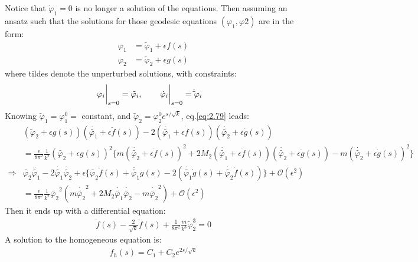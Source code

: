 Notice that $\dot \varphi_{1} = 0$ is no longer a solution of the equations. Then assuming an ansatz such that the solutions for those geodesic equations $(\varphi_{1}, \varphi{2})$ are in the form:
\begin{align}[left=\empheqlbrace]
    \varphi_{1} &= \tilde \varphi_{1} + \epsilon f(s) \\
    \varphi_{2} &= \tilde \varphi_{2} + \epsilon g(s) 
\end{align}
where tildes denote the unperturbed solutions, with constraints:
\begin{align}
    \eval{\varphi_{i} } _{s=0} = \tilde \varphi_{i} ,& \qq{} \eval{\dot \varphi_{i}} _{s=0} = \dot \tilde\varphi_{i} 
\end{align}
Knowing $\tilde \varphi_{1} = \varphi_{1}^{0} =$ constant, and $\tilde \varphi_{2} = \varphi_{2} ^{0} e^{s/\sqrt{k}}$, eq.\ref{eq:2.79} leads:
\begin{align}
    &(\tilde \varphi_{2} + \epsilon g(s))(\ddot {\tilde {\varphi_{1}}} + \epsilon \ddot f(s)) - 2 (\dot {\tilde{\varphi_{1}}} + \epsilon \dot {f}(s))(\dot {\tilde{\varphi_{2}}} +\epsilon \dot{g}(s)) \nonumber \\
    &= \frac{\epsilon}{8\pi^{2}}\frac{1}{k^2} (\tilde{\varphi_{2}} + \epsilon g(s))^{2}\lbrace m(\dot{\tilde{\varphi_{2}}} + \epsilon \dot{f}(s))^{2} +2M_{2} (\dot{\tilde{\varphi_{1}}} + \epsilon \dot{f}(s))(\dot{\tilde{\varphi_{2}}} + \epsilon \dot{g}(s)) - m (\dot{\tilde{\varphi_{2}}} + \epsilon \dot{g}(s))^{2} \rbrace \nonumber \\
    \Rightarrow &\tilde{\varphi_{2}}\ddot{\tilde{\varphi_{1}}}-2\dot{\tilde{\varphi_{1}}}\dot{\tilde{\varphi_{2}}} + \epsilon\lbrace \tilde{\varphi_{2}}\ddot{f}(s) + \ddot{\tilde{\varphi_{1}}}g(s) - 2(\dot{\tilde{\varphi_{1}}}\dot{g}(s) + \dot{\tilde{\varphi_{2}}}\dot{f}(s)) \rbrace  + \mathcal{O}(\epsilon ^{2}) \nonumber \\
    &= \frac{\epsilon}{8\pi^{2}}\frac{1}{k^{2}} \tilde{\varphi _{2}} ^{2} (m\dot{\tilde{\varphi_{2}}} ^{2} + 2M_{2} \dot{\tilde{\varphi_{1}}}\dot{\tilde{\varphi_{2}}} -m \dot{\tilde{\varphi_{2}}}^{2}) + \mathcal{O}(\epsilon^{2}) \nonumber
\end{align}
Then it ends up with a differential equation:
\begin{align}
    \label{eq:2.84}
    \ddot{f} (s) - \frac{2}{\sqrt{k}} \dot {f} (s)+ \frac{1}{8\pi^{2}} \frac{m}{k^{3}}\tilde \varphi_{2} ^{3} = 0 
\end{align}
A solution to the homogeneous equation is:
\begin{align}
    f_{h} (s) = C_{1} + C_{2} e^{2s/\sqrt{k}} 
\end{align}
